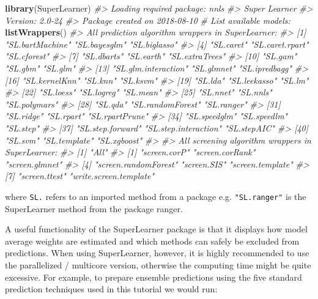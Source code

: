 \documentclass[graybox,natbib,nospthms,UStrade]{svmono}
\newenvironment{Shaded}{\begin{snugshade}}{\end{snugshade}}
\newcommand{\CommentTok}[1]{\textcolor[rgb]{0.37,0.37,0.37}{\textit{#1}}}
\newcommand{\KeywordTok}[1]{\textcolor[rgb]{0.27,0.27,0.27}{\textbf{#1}}}
\newcommand{\NormalTok}[1]{#1}
\begin{document}
\begin{Shaded}
\begin{Highlighting}[]
\KeywordTok{library}\NormalTok{(SuperLearner)}
\CommentTok{#> Loading required package: nnls}
\CommentTok{#> Super Learner}
\CommentTok{#> Version: 2.0-24}
\CommentTok{#> Package created on 2018-08-10}
\CommentTok{# List available models:}
\KeywordTok{listWrappers}\NormalTok{()}
\CommentTok{#> All prediction algorithm wrappers in SuperLearner:}
\CommentTok{#>  [1] "SL.bartMachine"      "SL.bayesglm"         "SL.biglasso"        }
\CommentTok{#>  [4] "SL.caret"            "SL.caret.rpart"      "SL.cforest"         }
\CommentTok{#>  [7] "SL.dbarts"           "SL.earth"            "SL.extraTrees"      }
\CommentTok{#> [10] "SL.gam"              "SL.gbm"              "SL.glm"             }
\CommentTok{#> [13] "SL.glm.interaction"  "SL.glmnet"           "SL.ipredbagg"       }
\CommentTok{#> [16] "SL.kernelKnn"        "SL.knn"              "SL.ksvm"            }
\CommentTok{#> [19] "SL.lda"              "SL.leekasso"         "SL.lm"              }
\CommentTok{#> [22] "SL.loess"            "SL.logreg"           "SL.mean"            }
\CommentTok{#> [25] "SL.nnet"             "SL.nnls"             "SL.polymars"        }
\CommentTok{#> [28] "SL.qda"              "SL.randomForest"     "SL.ranger"          }
\CommentTok{#> [31] "SL.ridge"            "SL.rpart"            "SL.rpartPrune"      }
\CommentTok{#> [34] "SL.speedglm"         "SL.speedlm"          "SL.step"            }
\CommentTok{#> [37] "SL.step.forward"     "SL.step.interaction" "SL.stepAIC"         }
\CommentTok{#> [40] "SL.svm"              "SL.template"         "SL.xgboost"}
\CommentTok{#> }
\CommentTok{#> All screening algorithm wrappers in SuperLearner:}
\CommentTok{#> [1] "All"}
\CommentTok{#> [1] "screen.corP"           "screen.corRank"        "screen.glmnet"        }
\CommentTok{#> [4] "screen.randomForest"   "screen.SIS"            "screen.template"      }
\CommentTok{#> [7] "screen.ttest"          "write.screen.template"}
\end{Highlighting}
\end{Shaded}

where \texttt{SL.} refers to an imported method from a package e.g. \texttt{"SL.ranger"} is the SuperLearner method from the package ranger.

A useful functionality of the SuperLearner package is that it displays how model average weights are estimated and which methods can safely be excluded from predictions. When using SuperLearner, however, it is highly recommended to use the parallelized / multicore version, otherwise the computing time might be quite excessive. For example, to prepare ensemble predictions using the five standard prediction techniques used in this tutorial we would run:
\end{document}
